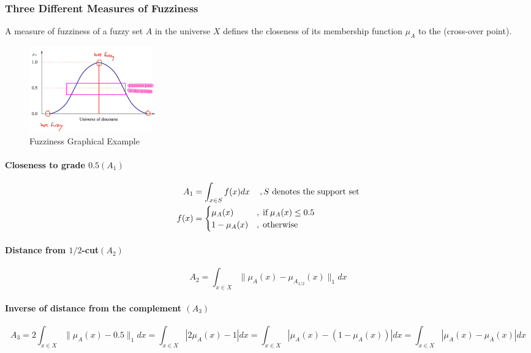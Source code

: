 \documentclass{tron}
\begin{document}
\subsubsection{Three Different Measures of Fuzziness}
A measure of fuzziness of a fuzzy set $A$ in the universe $X$ defines the closeness of its membership function $\mu_A$ to the  (cross-over point).
\begin{figure}[H]
	\centering
	\includegraphics[height=140px]{Figs/Fuzzy/fuzziness}
	\caption{Fuzziness Graphical Example}
	\label{fig:fuzzy:fuzziness:ex}
\end{figure}
\paragraph{Closeness to grade $0.5(A_1)$\label{par:fuzziness:A1}}
\begin{align}
	A_1 & = \int_{x\in S} f(x) dx \, \quad, S \text{ denotes the support set} \\
	f(x) & = \begin{cases}
		\mu_A(x) & ,\;\text{if}\; \mu_A(x) \leq 0.5 \\
		1-\mu_A(x) & ,\;\text{otherwise}
	\end{cases}
\end{align}
\paragraph{Distance from $1/2$-cut$(A_2)$\label{par:fuzziness:A2}}
\begin{equation}
	A_2 = \int_{x \in X} \|\mu_A(x) - \mu_{A_{1/2}}(x)\|_1 dx
\end{equation}
\paragraph{Inverse of distance from the complement $(A_3)$\label{par:fuzziness:A3}}
\begin{equation}
	A_3 = 2 \int_{x \in X} \|\mu_A(x) - 0.5\|_1 dx = \int_{x \in X} |2\mu_A(x) - 1| dx 
		= \int_{x \in X} |\mu_A(x) - (1-\mu_{A}(x))| dx = \int_{x \in X} |\mu_A(x) - \mu_{\bar A}(x)| dx
\end{equation}
\end{document}
